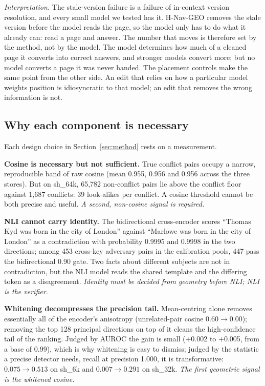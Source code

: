 \documentclass[journal=jcisd8,manuscript=article]{achemso}
\begin{document}
\emph{Interpretation.} The stale-version failure is a failure of in-context version resolution, and every small model we tested has it. H-Nav-GEO removes the stale version before the model reads the page, so the model only has to do what it already can: read a page and answer. The number that moves is therefore set by the method, not by the model. The model determines how much of a cleaned page it converts into correct answers, and stronger models convert more; but no model converts a page it was never handed. The placement controls make the same point from the other side. An edit that relies on how a particular model weights position is idiosyncratic to that model; an edit that removes the wrong information is not.

\subsection{Why each component is necessary}
\label{sec:components}

Each design choice in Section~\ref{sec:method} rests on a measurement.

\textbf{Cosine is necessary but not sufficient.} True conflict pairs occupy a narrow, reproducible band of raw cosine (mean 0.955, 0.956 and 0.956 across the three stores). But on sh\_64k, 65,782 non-conflict pairs lie above the conflict floor against 1,687 conflicts: 39 look-alikes per conflict. A cosine threshold cannot be both precise and useful. \emph{A second, non-cosine signal is required.}

\textbf{NLI cannot carry identity.} The bidirectional cross-encoder scores ``Thomas Kyd was born in the city of London'' against ``Marlowe was born in the city of London'' as a contradiction with probability 0.9995 and 0.9998 in the two directions; among 453 cross-key adversary pairs in the calibration pools, 447 pass the bidirectional 0.90 gate. Two facts about different subjects are not in contradiction, but the NLI model reads the shared template and the differing token as a disagreement. \emph{Identity must be decided from geometry before NLI; NLI is the verifier.}

\textbf{Whitening decompresses the precision tail.} Mean-centring alone removes essentially all of the encoder's anisotropy (unrelated-pair cosine $0.60\to0.00$); removing the top 128 principal directions on top of it cleans the high-confidence tail of the ranking. Judged by AUROC the gain is small (+0.002 to +0.005, from a base of 0.99), which is why whitening is easy to dismiss; judged by the statistic a precise detector needs, recall at precision 1.000, it is transformative: $0.075\to0.513$ on sh\_6k and $0.007\to0.291$ on sh\_32k. \emph{The first geometric signal is the whitened cosine.}
\end{document}
